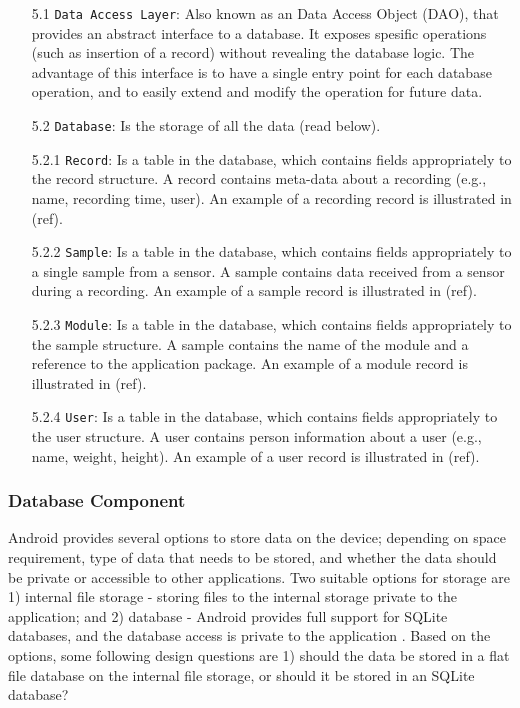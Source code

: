 \begin{itemize}
    \item[5.1] \verb|Data Access Layer|: Also known as an Data Access Object (DAO), that provides an abstract interface to a database. It exposes spesific operations (such as insertion of a record) without revealing the database logic. The advantage of this interface is to have a single entry point for each database operation, and to easily extend and modify the operation for future data. 
    \item[5.2] \verb|Database|: Is the storage of all the data (read below).
    \item[5.2.1] \verb|Record|: Is a table in the database, which contains fields appropriately to the record structure. A record contains meta-data about a recording (e.g., name, recording time, user). An example of a recording record is illustrated in (ref).
    \item[5.2.2] \verb|Sample|: Is a table in the database, which contains fields appropriately to a single sample from a sensor. A sample contains data received from a sensor during a recording. An example of a sample record is illustrated in (ref).
    \item[5.2.3] \verb|Module|: Is a table in the database, which contains fields appropriately to the sample structure. A sample contains the name of the module and a reference to the application package. An example of a module record is illustrated in (ref).
    \item[5.2.4] \verb|User|: Is a table in the database, which contains fields appropriately to the user structure. A user contains person information about a user (e.g., name, weight, height). An example of a user record is illustrated in (ref).
\end{itemize}

\subsubsection{Database Component}

\noindent Android provides several options to store data on the device; depending on space requirement, type of data that needs to be stored, and whether the data should be private or accessible to other applications. Two suitable options for storage are 1) internal file storage - storing files to the internal storage private to the application; and 2) database - Android provides full support for SQLite databases, and the database access is private to the application \cite{android_storage}. Based on the options, some following design questions are 1) should the data be stored in a flat file database on the internal file storage, or should it be stored in an SQLite database?

